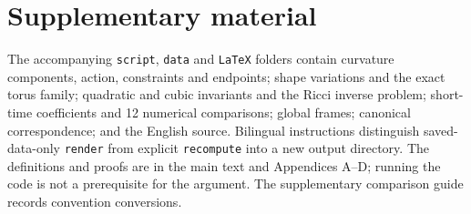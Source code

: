 \section{Supplementary material}

The accompanying \texttt{script}, \texttt{data} and \texttt{LaTeX} folders contain curvature components, action, constraints and endpoints; shape variations and the exact torus family; quadratic and cubic invariants and the Ricci inverse problem; short-time coefficients and 12 numerical comparisons; global frames; canonical correspondence; and the English source. Bilingual instructions distinguish saved-data-only \texttt{render} from explicit \texttt{recompute} into a new output directory. The definitions and proofs are in the main text and Appendices A--D; running the code is not a prerequisite for the argument. The supplementary comparison guide records convention conversions.
